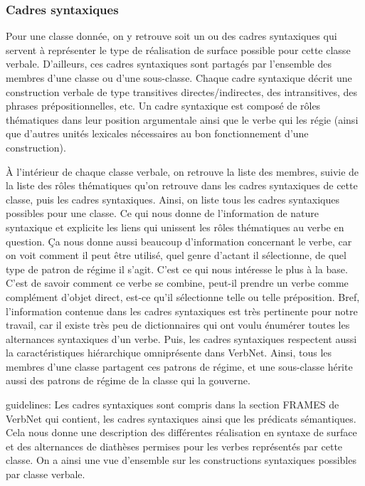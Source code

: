 \subsubsection{Cadres syntaxiques}

Pour une classe donnée, on y retrouve soit un ou des cadres syntaxiques qui servent à représenter le type de réalisation de surface possible pour cette classe verbale. D'ailleurs, ces cadres syntaxiques sont partagés par l'ensemble des membres d'une classe ou d'une sous-classe. Chaque cadre syntaxique décrit une construction verbale de type transitives directes/indirectes, des intransitives, des phrases prépositionnelles, etc. Un cadre syntaxique est composé de rôles thématiques dans leur position argumentale ainsi que le verbe qui les régie (ainsi que d'autres unités lexicales nécessaires au bon fonctionnement d'une construction).

À l'intérieur de chaque classe verbale, on retrouve la liste des membres, suivie de la liste des rôles thématiques qu'on retrouve dans les cadres syntaxiques de cette classe, puis les cadres syntaxiques. Ainsi, on liste tous les cadres syntaxiques possibles pour une classe. Ce qui nous donne de l'information de nature syntaxique et explicite les liens qui unissent les rôles thématiques au verbe en question. Ça nous donne aussi beaucoup d'information concernant le verbe, car on voit comment il peut être utilisé, quel genre d'actant il sélectionne, de quel type de patron de régime il s'agit. C'est ce qui nous intéresse le plus à la base. C'est de savoir comment ce verbe se combine, peut-il prendre un verbe comme complément d'objet direct, est-ce qu'il sélectionne telle ou telle préposition. Bref, l'information contenue dans les cadres syntaxiques est très pertinente pour notre travail, car il existe très peu de dictionnaires qui ont voulu énumérer toutes les alternances syntaxiques d'un verbe. Puis, les cadres syntaxiques respectent aussi la caractéristiques hiérarchique omniprésente dans VerbNet. Ainsi, tous les membres d'une classe partagent ces patrons de régime, et une sous-classe hérite aussi des patrons de régime de la classe qui la gouverne. 

guidelines: Les cadres syntaxiques sont compris dans la section FRAMES de VerbNet qui contient, les cadres syntaxiques ainsi que les prédicats sémantiques. Cela nous donne une description des différentes réalisation en syntaxe de surface et des alternances de diathèses permises pour les verbes représentés par cette classe. On a ainsi une vue d'ensemble sur les constructions syntaxiques possibles par classe verbale. 

